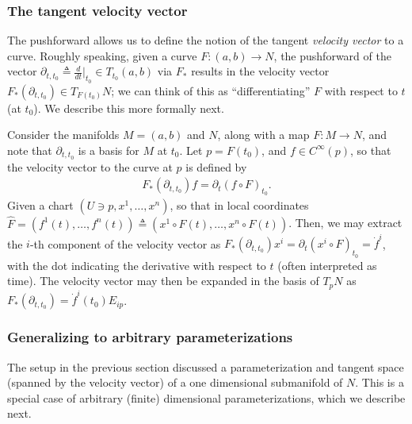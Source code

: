 \subsubsection{The tangent velocity vector}\label{sec:tangent_velo}
The pushforward allows us to define the notion of the tangent \textit{velocity vector} to a curve. Roughly speaking, given a {curve} $F:(a,b)\rightarrow N$, the pushforward of the vector $\partial_{t, t_0} \triangleq \frac{d}{dt} \bigr|_{t_0}\in T_{t_0}(a,b)$ via $F_*$ results in the velocity vector $F_*(\partial_{t, t_0})\in T_{F(t_0)}N$; we can think of this as ``differentiating'' $F$ with respect to $t$ (at $t_0$). We describe this more formally next. 

Consider the manifolds $M = (a,b)$ and $N$, along with a map $F:M\rightarrow N$, and note that $\partial_{t,t_0}$ is a basis for $M$ at $t_0$. Let $p=F(t_0)$, and $f\in C^{\infty}(p)$, so that the {velocity vector} to the curve at $p$ is defined by 
\begin{align}\label{eq:velocityvec}
F_*\left(\partial_{t,t_0}\right)f = \partial_t\left(f\circ F\right)_{t_0}.
\end{align}
Given a chart $(U \ni p, x^1, \dots, x^n)$, so that in local coordinates $\hat F = (f^1(t), \dots, f^n(t)) \triangleq (x^1\circ F(t), \dots, x^n \circ F(t))$. 
Then, we may extract the $i$-th component of the velocity vector as $F_*(\partial_{t, t_0}) x^i ={} \partial_{t}(x^i \circ F)_{t_0} = \dot{f}^i$,
with the dot indicating the derivative with respect to $t$ (often interpreted as time). The velocity vector may then be expanded in the basis of $T_pN$ as $F_*(\partial_{t, t_0}) = \dot f^i(t_0)E_{ip}$. 

\subsubsection{Generalizing to arbitrary parameterizations} The setup in the previous section discussed a parameterization and tangent space (spanned by the velocity vector) of a one dimensional submanifold of $N$. 
This is a special case of arbitrary (finite) dimensional parameterizations, which we describe next. 

